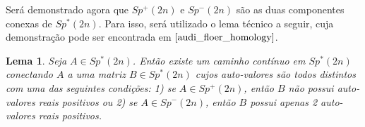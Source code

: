 \documentclass[12pt]{book}
\newtheorem{lema}[teorema]{Lema}
\newcommand{\gruposimpleticonaodegenerado}[1]{Sp^{#1}(2n)}
\begin{document}
	Será demonstrado agora que $\gruposimpleticonaodegenerado{+}$ e  $\gruposimpleticonaodegenerado{-}$ são as duas componentes conexas de $\gruposimpleticonaodegenerado{*}$. Para isso, será utilizado o lema técnico a seguir, cuja demonstração pode ser encontrada em  $\cite{audi_floer_homology}$.
	
	\begin{lema}\label{lema_conectividade_grupo_simlpetico_nao_degenerado}
		Seja $A\in \gruposimpleticonaodegenerado{*}$. Então existe um caminho contínuo em $\gruposimpleticonaodegenerado{*}$ conectando $A$ a uma matriz $B \in \gruposimpleticonaodegenerado{*}$ cujos  auto-valores são todos distintos com uma das seguintes condições: 1) se $A\in \gruposimpleticonaodegenerado{+}$, então $B$ não possui auto-valores reais positivos ou 2) se $A\in \gruposimpleticonaodegenerado{-}$, então $B$ possui apenas 2 auto-valores reais positivos.
	\end{lema}
	
\end{document}
